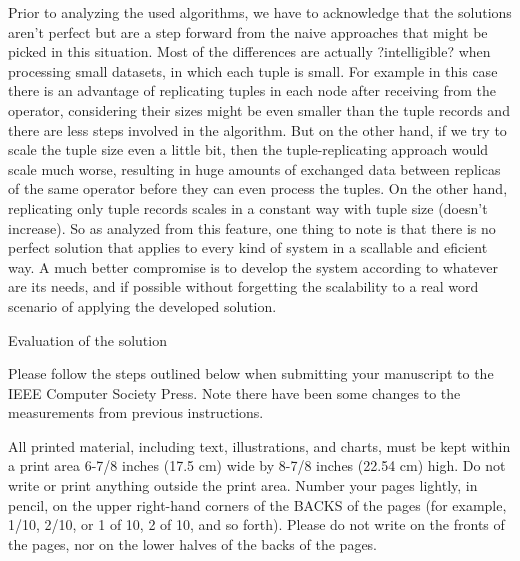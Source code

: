 \documentclass[times, 10pt,twocolumn]{article}
\begin{document}
Prior to analyzing the used algorithms, we have to acknowledge that the
solutions aren't perfect but are a step forward from the naive approaches
that might be picked in this situation. Most of the differences are actually
?intelligible? when processing small datasets, in which each tuple is small.
For example in this case there is an advantage of replicating tuples in each
node after receiving from the operator, considering their sizes might be even
smaller than the tuple records and there are less steps involved in the
algorithm. But on the other hand, if we try to scale the tuple size even
a little bit, then the tuple-replicating approach would scale much worse,
resulting in huge amounts of exchanged data between replicas of the same
operator before they can even process the tuples. On the other hand, replicating
only tuple records scales in a constant way with tuple size (doesn't increase).
So as analyzed from this feature, one thing to note is that there is no perfect
solution that applies to every kind of system in a scallable and eficient way.
A much better compromise is to develop the system according to whatever are
its needs, and if possible without forgetting the scalability to a real word
scenario of applying the developed solution.


Evaluation of the solution


Please follow the steps outlined below when submitting your manuscript to
the IEEE Computer Society Press. Note there have been some changes to the
measurements from previous instructions. 


All printed material, including text, illustrations, and charts, must be
kept within a print area 6-7/8 inches (17.5 cm) wide by 8-7/8 inches
(22.54 cm) high.  Do not write or print anything outside the print area.
Number your pages lightly, in pencil, on the upper right-hand corners of
the BACKS of the pages (for example, 1/10, 2/10, or 1 of 10, 2 of 10, and
so forth). Please do not write on the fronts of the pages, nor on the
lower halves of the backs of the pages.


\end{document}
